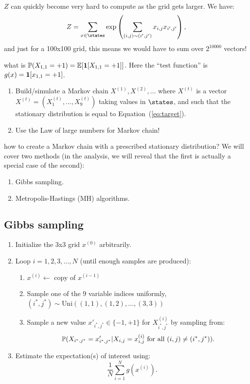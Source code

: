 \documentclass{article}
\begin{document}
 $Z$ can quickly become very hard to compute as the grid gets larger. We have: \[Z = \sum_{x \in \states} \exp\left( \sum_{(i,j)\sim(i',j')} x_{i,j} x_{i',j'} \right),\]and just for a 100x100 grid, this means we would have to sum over $2^{10000}$ vectors!

 what is $\P(X_{1,1} = +1) = \E[\1[X_{1,1} = +1]]$. Here the ``test function'' is $g(x) = \1[x_{1,1} = +1]$. 

\begin{enumerate}
  \item Build/simulate a Markov chain $X^{(1)}, X^{(2)}, \dots$ where $X^{(t)}$ is a vector $X^{(t)} = (X^{(t)}_1, \dots, X^{(t)}_9)$ taking values in $\states$, and such that the stationary distribution is equal to Equation~(\ref{eq:target}).
  \item Use the Law of large numbers for Markov chain!
\end{enumerate}

 how to create a Markov chain with a prescribed stationary distribution? We will cover two methods (in the analysis, we will reveal that the first is actually a special case of the second):
\begin{enumerate}
  \item Gibbs sampling.
  \item Metropolis-Hastings (MH) algorithms.
\end{enumerate}


\subsection{Gibbs sampling}

\begin{enumerate}
  \item Initialize the 3x3 grid $x^{(0)}$ arbitrarily.
  \item Loop $i = 1, 2, 3, \dots, N$ (until enough samples are produced):
  \begin{enumerate}
     \item $x^{(i)} \gets$ copy of $x^{(i-1)}$
     \item Sample one of the 9 variable indices uniformly, $(i^*, j^*) \sim \text{Uni}((1,1), (1,2), \dots, (3,3))$ \label{line:sampling-variable}
     \item Sample a new value $x'_{i^*,j^*}\in \{-1,+1\}$ for $X^{(i)}_{i^*, j^*}$ by sampling from:  \begin{equation}\label{eq:conditional-Gibbs} \P(X_{i^*,j^*} = x'_{i^*,j^*} | X_{i,j} = x^{(i)}_{i,j}\text{ for all }(i,j) \neq (i^*,j^*)). \end{equation}
  \end{enumerate}
  \item Estimate the expectation(s) of interest using: \[ \frac{1}{N} \sum_{i=1}^N g(x^{(i)}). \]
\end{enumerate}
\end{document}
